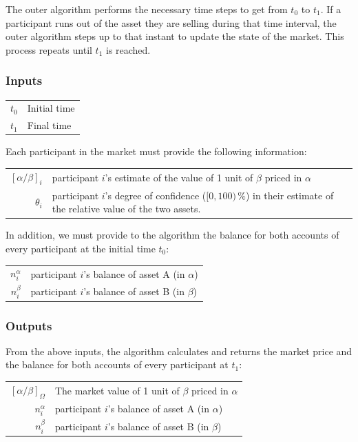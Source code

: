 \documentclass[letterpaper]{article}
\begin{document}
The outer algorithm performs the necessary time steps to get from $t_0$ to $t_1$. If a participant runs out of the asset they are selling during that time interval, the outer algorithm steps up to that instant to update the state of the market. This process repeats until $t_1$ is reached.

\subsubsection{Inputs}

\begin{tabularx}{\textwidth}{rX}
 $t_0$ & Initial time \\
$t_1$ & Final time
\end{tabularx}

Each participant in the market must provide the following information:

\begin{tabularx}{\textwidth}{rX}
 $[\alpha/\beta]_i$ & participant $i$'s estimate of the value of 1 unit of $\beta$ priced in $\alpha$ \\
$\theta_i$ & participant $i$'s degree of confidence ($[0,100)\,\%$) in their estimate of the relative value of the two assets.
\end{tabularx}

In addition, we must provide to the algorithm the balance for both accounts of every participant at the initial time $t_0$:

\begin{tabularx}{\textwidth}{rX}
 $n_i^\alpha$ & participant $i$'s balance of asset A (in $\alpha$) \\
$n_i^\beta$ & participant $i$'s balance of asset B (in $\beta$)
\end{tabularx}

\subsubsection{Outputs}
From the above inputs, the algorithm calculates and returns the market price and the balance for both accounts of every participant at $t_1$:

\begin{tabularx}{\textwidth}{rX}
 $[\alpha/\beta]_\Omega$ & The market value of 1 unit of $\beta$ priced in $\alpha$ \\
 $n_i^\alpha$ & participant $i$'s balance of asset A (in $\alpha$) \\
$n_i^\beta$ & participant $i$'s balance of asset B (in $\beta$)
\end{tabularx}
\end{document}
